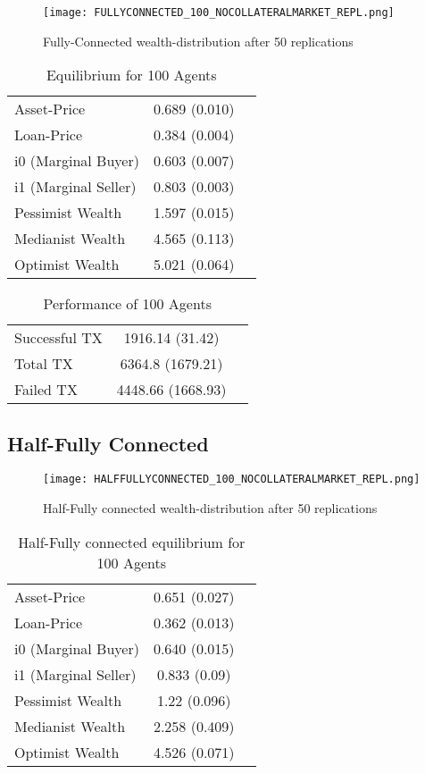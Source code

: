 \documentclass[Bachelorarbeit.tex]{subfiles}
\begin{document}
\begin{figure}[!htbp]
	\centering
  \texttt{[image: FULLYCONNECTED\_100\_NOCOLLATERALMARKET\_REPL.png]}
	\caption{Fully-Connected wealth-distribution after 50 replications}
	\label{fig1}
\end{figure}

\begin{table}[h]
	\caption{Equilibrium for 100 Agents}
	\centering
	\begin{tabular} { l c r }
		\hline
		Asset-Price & 0.689 (0.010) \\
		Loan-Price & 0.384 (0.004) \\
		i0 (Marginal Buyer) & 0.603 (0.007) \\
		i1 (Marginal Seller) & 0.803 (0.003) \\
		Pessimist Wealth & 1.597 (0.015) \\
		Medianist Wealth & 4.565 (0.113) \\
		Optimist Wealth & 5.021 (0.064) \\
		\hline
	\end{tabular}
\end{table} 

\begin{table}[h]
	\caption{Performance of 100 Agents}
	\centering
	\begin{tabular} { l c r }
		\hline
		Successful TX & 1916.14 (31.42) \\
		Total TX & 6364.8 (1679.21) \\
		Failed TX & 4448.66 (1668.93) \\
		\hline
	\end{tabular}
\end{table}

\subsection{Half-Fully Connected}
\begin{figure}[!htbp]
	\centering
  \texttt{[image: HALFFULLYCONNECTED\_100\_NOCOLLATERALMARKET\_REPL.png]}
	\caption{Half-Fully connected wealth-distribution after 50 replications}
	\label{fig1}
\end{figure}

\begin{table}[!htbp]
	\caption{Half-Fully connected equilibrium for 100 Agents}
	\centering
	\begin{tabular} { l c r }
		\hline
		Asset-Price & 0.651 (0.027) \\
		Loan-Price & 0.362 (0.013) \\
		i0 (Marginal Buyer) & 0.640 (0.015) \\
		i1 (Marginal Seller) & 0.833 (0.09) \\
		Pessimist Wealth & 1.22 (0.096) \\
		Medianist Wealth & 2.258 (0.409) \\
		Optimist Wealth & 4.526 (0.071) \\
		\hline
	\end{tabular}
\end{table} 
\end{document}
